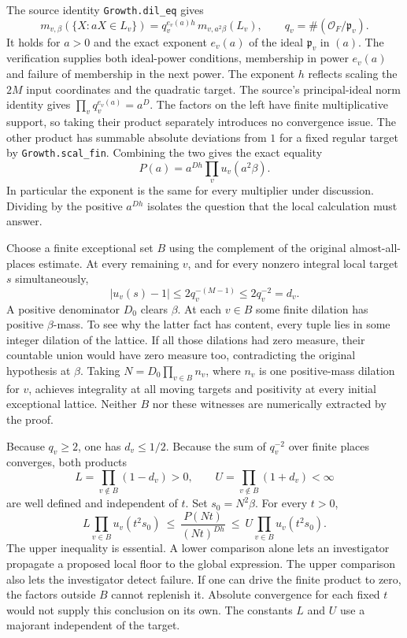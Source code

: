 \documentclass[12pt,letterpaper]{article}
\begin{document}
The source identity \texttt{Growth.dil\_eq} gives
\[
 m_{v,\beta}(\{X:aX\in L_v\})
       = q_v^{e_v(a)h}\,m_{v,a^2\beta}(L_v),
 \qquad q_v=\#(\mathcal O_F/\mathfrak p_v).
\]
It holds for $a>0$ and the exact exponent $e_v(a)$ of the ideal $\mathfrak p_v$ in $(a)$. The verification supplies both ideal-power conditions, membership in power $e_v(a)$ and failure of membership in the next power. The exponent $h$ reflects scaling the $2M$ input coordinates and the quadratic target. The source's principal-ideal norm identity gives $\prod_v q_v^{e_v(a)}=a^D$. The factors on the left have finite multiplicative support, so taking their product separately introduces no convergence issue. The other product has summable absolute deviations from $1$ for a fixed regular target by \texttt{Growth.scal\_fin}. Combining the two gives the exact equality
\begin{equation}
  \label{eq:exactglobalwave}
  P(a)=a^{Dh}\prod_v u_v(a^2\beta).
\end{equation}
In particular the exponent is the same for every multiplier under discussion. Dividing by the positive $a^{Dh}$ isolates the question that the local calculation must answer.

Choose a finite exceptional set $B$ using the complement of the original almost-all-places estimate. At every remaining $v$, and for every nonzero integral local target $s$ simultaneously,
\[
 |u_v(s)-1|\leq 2q_v^{-(M-1)}\leq 2q_v^{-2}=d_v.
\]
A positive denominator $D_0$ clears $\beta$. At each $v\in B$ some finite dilation has positive $\beta$-mass. To see why the latter fact has content, every tuple lies in some integer dilation of the lattice. If all those dilations had zero measure, their countable union would have zero measure too, contradicting the original hypothesis at $\beta$. Taking $N=D_0\prod_{v\in B} n_v$, where $n_v$ is one positive-mass dilation for $v$, achieves integrality at all moving targets and positivity at every initial exceptional lattice. Neither $B$ nor these witnesses are numerically extracted by the proof.

Because $q_v\geq2$, one has $d_v\leq1/2$. Because the sum of $q_v^{-2}$ over finite places converges, both products
\[
 L=\prod_{v\notin B}(1-d_v)>0,\qquad
 U=\prod_{v\notin B}(1+d_v)<\infty
\]
are well defined and independent of $t$. Set $s_0=N^2\beta$. For every $t>0$,
\begin{equation}
 \label{eq:sandwichwave}
 L\prod_{v\in B}u_v(t^2s_0)
 \ \leq\ \frac{P(Nt)}{(Nt)^{Dh}}\ \leq\
 U\prod_{v\in B}u_v(t^2s_0).
\end{equation}
The upper inequality is essential. A lower comparison alone lets an investigator propagate a proposed local floor to the global expression. The upper comparison also lets the investigator detect failure. If one can drive the finite product to zero, the factors outside $B$ cannot replenish it. Absolute convergence for each fixed $t$ would not supply this conclusion on its own. The constants $L$ and $U$ use a majorant independent of the target.
\end{document}
